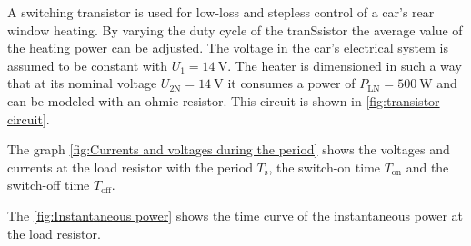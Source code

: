 

A switching transistor is used for low-loss and stepless control of a car's rear window heating.
By varying the duty cycle of the tranSsistor the average value of the heating power can be adjusted. The voltage in the car's electrical system is assumed to be constant with $U_1 = \SI{14}{\volt}$. The heater is dimensioned in such a way
that at its nominal voltage $ U_{\mathrm{2N}} = \SI{14}{\volt}$ it consumes a power of $ P_{\mathrm{LN}} = \SI{500}{\watt}$ and
can be modeled with an ohmic resistor. This circuit is shown in \autoref{fig:transistor circuit}.


\begin{solutionblock}
The graph \autoref{fig:Currents and voltages during the period} shows the voltages and currents at the load resistor with the period $T_{\mathrm{s}}$, the switch-on time $T_{\mathrm{on}}$ and the switch-off time $T_{\mathrm{off}}$. 


            
\end{solutionblock}



\begin {solutionblock}
The \autoref{fig:Instantaneous power} shows the time curve of the instantaneous power at the load resistor.



\end{solutionblock}


